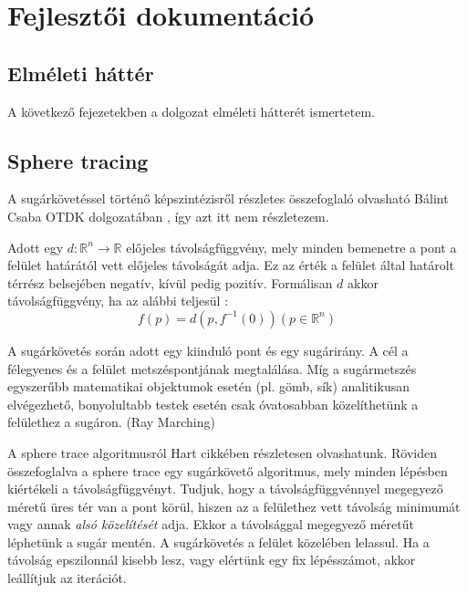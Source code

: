 \chapter{Fejlesztői dokumentáció}
\label{ch:developer}


\section{Elméleti háttér}

A következő fejezetekben a dolgozat elméleti hátterét ismertetem. 

\section{Sphere tracing}

A sugárkövetéssel történő képszintézisről részletes összefoglaló olvasható Bálint Csaba OTDK dolgozatában \cite[11-16. o.]{BalintCsaba}, így azt itt nem részletezem.

Adott egy $d:\mathbb{R}^n\rightarrow\mathbb{R}$ előjeles távolságfüggvény, mely minden bemenetre a pont a felület határától vett előjeles távolságát adja. Ez az érték a felület által határolt térrész belsejében negatív, kívül pedig pozitív. Formálisan $d$ akkor távolságfüggvény, ha az alábbi teljesül \cite{Hart1996}:
$$f(p) = d(p, f^{-1}(0)) (p \in \mathbb{R}^n)$$

A sugárkövetés során adott egy kiinduló pont és egy sugárirány. A cél a félegyenes és a felület metszéspontjának megtalálása. Míg a sugármetszés egyszerűbb matematikai objektumok esetén (pl. gömb, sík) analitikusan elvégezhető, bonyolultabb testek esetén csak óvatosabban közelíthetünk a felülethez a sugáron. (Ray Marching\cite{RayMarching})

A sphere trace algoritmusról Hart cikkében \cite{Hart1996} részletesen olvashatunk. Röviden összefoglalva a sphere trace egy sugárkövető algoritmus, mely minden lépésben kiértékeli a távolságfüggvényt. Tudjuk, hogy a távolságfüggvénnyel megegyező méretű üres tér van a pont körül, hiszen az a felülethez vett távolság minimumát vagy annak \emph{alsó közelítését} adja. Ekkor a távolsággal megegyező méretűt léphetünk a sugár mentén. A sugárkövetés a felület közelében lelassul. Ha a távolság epszilonnál kisebb lesz, vagy elértünk egy fix lépésszámot, akkor leállítjuk az iterációt.  



